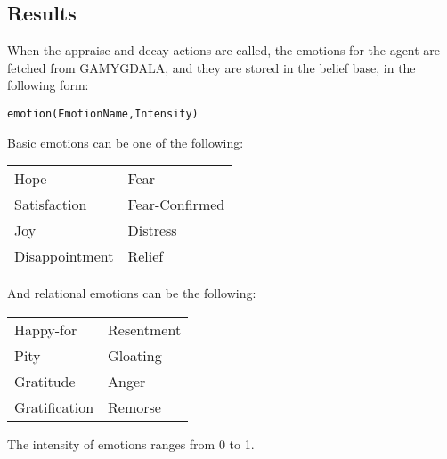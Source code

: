 \clearpage
\subsection{Results}
When the appraise and decay actions are called, the emotions for the agent are fetched from GAMYGDALA, and they are stored in the belief base, in the following form:
\begin{center}
	\texttt{emotion(EmotionName,Intensity)}
\end{center}

\hspace{-\parindent}Basic emotions can be one of the following:\\

\noindent
\begin{tabular}[H]{@{}p{2.59cm} l}
	Hope & Fear \\
	Satisfaction & Fear-Confirmed \\
	Joy & Distress \\
	Disappointment & Relief
\end{tabular}

\vspace{1em}\hspace{-\parindent}And relational emotions can be the following:\\

\noindent
\begin{tabular}[H]{@{}p{2.59cm} l}
	Happy-for & Resentment \\
	Pity & Gloating \\
	Gratitude & Anger \\
	Gratification & Remorse
\end{tabular}

\vspace{1em}\hspace{-\parindent}The intensity of emotions ranges from 0 to 1.